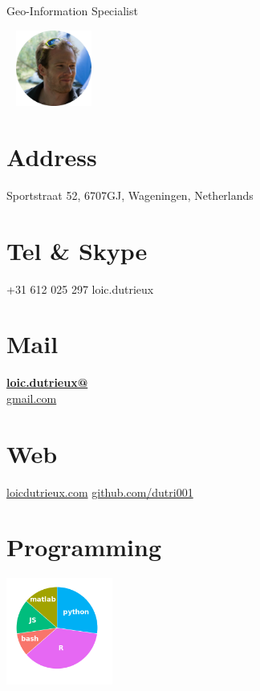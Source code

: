 \documentclass[]{friggeri-cv}
\begin{document}
      {Geo-Information Specialist}
      

\begin{aside}
    ~
    \includegraphics[width=2.5cm]{img/loic_circle.png}
    ~
  \section{Address}
    Sportstraat 52,
    6707GJ, Wageningen, Netherlands
    ~
  \section{Tel \& Skype}
    +31 612 025 297
    loic.dutrieux
    ~
  \section{Mail}
    \href{mailto:loic.dutrieux@gmail.com}{\textbf{loic.dutrieux@}\\gmail.com}
    ~
  \section{Web}
    \href{http://www.loicdutrieux.com}{loicdutrieux.com}
    \href{https://github.com/dutri001}{github.com/dutri001}
    ~
  \section{Programming}
    \includegraphics[width=3.5cm]{img/programming.png}
    ~

\end{aside}
\end{document}
